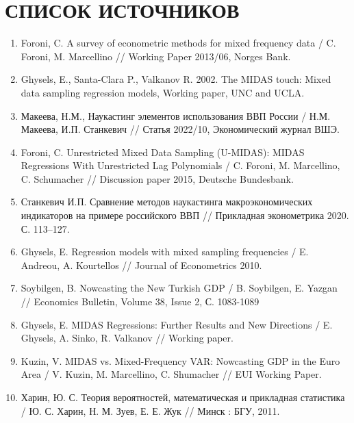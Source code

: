 \documentclass[a4paper, 12pt]{extarticle}
\numberwithin{equation}{subsection}
\begin{document}
	\section*{СПИСОК ИСТОЧНИКОВ}
	\begin{enumerate}
		\item Foroni, C. A survey of econometric methods for mixed frequency data / C. Foroni, M. Marcellino // Working Paper 2013/06, Norges Bank.
		\item Ghysels, E., Santa-Clara P., Valkanov R. 2002. The MIDAS touch: Mixed data sampling regression models, Working paper, UNC and UCLA.
		\item Макеева, Н.М., Наукастинг элементов использования ВВП России / Н.М. Макеева, И.П. Станкевич // Статья 2022/10, Экономический журнал ВШЭ.
		\item Foroni, C. Unrestricted Mixed Data Sampling (U-MIDAS): MIDAS Regressions With Unrestricted Lag Polynomials / C. Foroni, M. Marcellino, C. Schumacher // Discussion paper 2015, Deutsche Bundesbank.
		\item Станкевич И.П. Сравнение методов наукастинга макроэкономических индикаторов на примере российского ВВП // Прикладная эконометрика 2020. С. 113–127.
		\item Ghysels, E. Regression models with mixed sampling frequencies /  E. Andreou, A. Kourtellos // Journal of Econometrics 2010.
		\item Soybilgen, B. Nowcasting the New Turkish GDP / B. Soybilgen, E. Yazgan // Economics Bulletin, Volume 38, Issue 2, 
		С. 1083-1089
		\item Ghysels, E. MIDAS Regressions: Further Results and New Directions / E. Ghysels, A. Sinko, R. Valkanov // Working paper.
		\item Kuzin, V. MIDAS vs. Mixed-Frequency VAR:
		Nowcasting GDP in the Euro Area / V. Kuzin,
		M. Marcellino, C. Shumacher // EUI Working Paper.
		\item Харин, Ю. С. Теория вероятностей,
		математическая
		и прикладная статистика / Ю. С. Харин, Н. М. Зуев, Е. Е. Жук // Минск : БГУ, 2011. 
	\end{enumerate}
	\newpage
\end{document}
